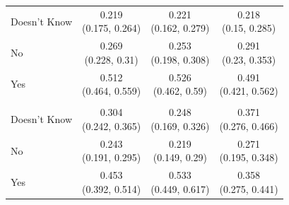 \begin{tabular}[t]{lccc}
\addlinespace[0.3em]
\hline
\multicolumn{4}{l}{\textbf{Ink}}\\
\hline
\hspace{1em}Doesn't Know & \makecell[c]{0.219\\(0.175, 0.264)} & \makecell[c]{0.221\\(0.162, 0.279)} & \makecell[c]{0.218\\(0.15, 0.285)}\\
\hspace{1em}No & \makecell[c]{0.269\\(0.228, 0.31)} & \makecell[c]{0.253\\(0.198, 0.308)} & \makecell[c]{0.291\\(0.23, 0.353)}\\
\hspace{1em}Yes & \makecell[c]{0.512\\(0.464, 0.559)} & \makecell[c]{0.526\\(0.462, 0.59)} & \makecell[c]{0.491\\(0.421, 0.562)}\\
\addlinespace[0.3em]
\hline
\multicolumn{4}{l}{\textbf{Control}}\\
\hline
\hspace{1em}Doesn't Know & \makecell[c]{0.304\\(0.242, 0.365)} & \makecell[c]{0.248\\(0.169, 0.326)} & \makecell[c]{0.371\\(0.276, 0.466)}\\
\hspace{1em}No & \makecell[c]{0.243\\(0.191, 0.295)} & \makecell[c]{0.219\\(0.149, 0.29)} & \makecell[c]{0.271\\(0.195, 0.348)}\\
\hspace{1em}Yes & \makecell[c]{0.453\\(0.392, 0.514)} & \makecell[c]{0.533\\(0.449, 0.617)} & \makecell[c]{0.358\\(0.275, 0.441)}\\
\bottomrule
\end{tabular}

